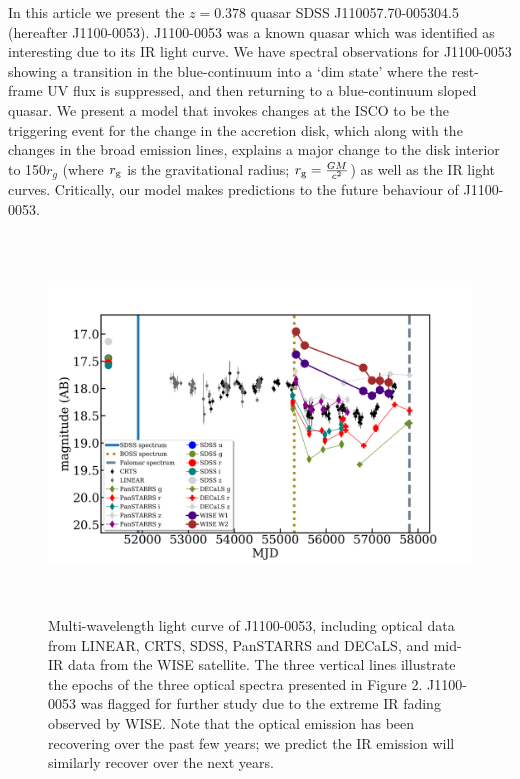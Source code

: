 \documentclass{nature}
\begin{document}
In this article we present the $z=0.378$ quasar SDSS J110057.70-005304.5 (hereafter J1100-0053).  J1100-0053 was a known quasar which was identified as interesting due to its IR light curve. We have spectral observations for J1100-0053 showing a transition in the blue-continuum into a `dim state' where the rest-frame UV flux is suppressed, and then returning to a blue-continuum sloped quasar.  We present a model that invokes changes at the ISCO to be the triggering event for the change in the accretion disk, which along with the changes in the broad emission lines, explains a major change to the disk interior to 150$r_{g}$ (where $r_{\rm g}$ is the gravitational radius; $r_{\rm g}=\frac{GM}{c^2}$) as well as the IR light curves. Critically, our model makes predictions to the future behaviour of J1100-0053.


\begin{figure}
  \centering
  \includegraphics[width=16.00cm, height=10.00cm, trim=0.0cm 0.0cm 0.0cm 0.0cm, clip]
  {../plots/lc/J110057_lc_20171204v1.png}
  \caption[]{
    Multi-wavelength light curve of J1100-0053, including optical data from LINEAR, CRTS, SDSS, PanSTARRS and DECaLS, and mid-IR data from the WISE satellite.  The three vertical lines illustrate the epochs of the three optical spectra presented in Figure 2.  J1100-0053 was flagged for further study due to the extreme IR fading observed by WISE.  Note that the optical emission has been recovering over the past few years; we predict the IR emission will similarly recover over the next years.}
  \label{fig:J110057_LC_CRTS}
\end{figure}
\end{document}
